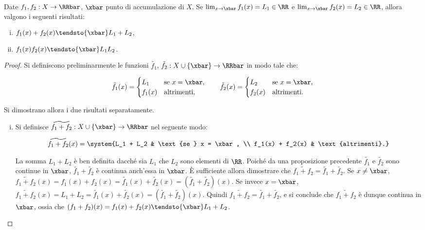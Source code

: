 \documentclass[11pt]{article}
\begin{document}
	\begin{proposition}
		Date $f_1, f_2 : X \to \RRbar$, $\xbar$ punto di accumulazione
		di $X$. Se $\lim_{x \to \xbar} f_1(x) = L_1 \in \RR$ e
		$\lim_{x \to \xbar} f_2(x) = L_2 \in \RR$, allora valgono
		i seguenti risultati:
		
		\begin{enumerate}[(i)]
			\item $f_1(x) + f_2(x) \tendsto{\xbar} L_1 + L_2$,
			\item $f_1(x) f_2(x) \tendsto{\xbar} L_1 L_2$.
		\end{enumerate}
	\end{proposition}

	\begin{proof}
		Si definiscono preliminarmente le funzioni $\tilde{f_1}$, $\tilde{f_2} : X \cup \{\xbar\} \to \RRbar$ in modo tale che:
		
		\[ \tilde{f_1}(x) = \begin{cases}
			L_1 & \text{se } x = \xbar, \\
			f_1(x) & \text{altrimenti},
		\end{cases} \qquad
		\tilde{f_2}(x) = \begin{cases}
			L_2 & \text{se } x = \xbar, \\
			f_2(x) & \text{altrimenti}.
		\end{cases} \]
		
		\vskip 0.05in
	
		Si dimostrano allora i due risultati separatamente. \\
		
		\begin{enumerate}[(i)]
			\item Si definisce $\widetilde{f_1 + f_2} : X \cup \{\xbar\} \to \RRbar$ nel seguente modo:
			
			\[ \widetilde{f_1 + f_2}(x) = \system{L_1 + L_2 & \text{se } x = \xbar, \\ f_1(x) + f_2(x) & \text{altrimenti}.} \]
			
			La somma $L_1 + L_2$ è ben definita dacché sia $L_1$ che $L_2$ sono elementi di $\RR$.
			Poiché da una proposizione precedente $\tilde{f_1}$ e $\tilde{f_2}$ sono continue in $\xbar$, $\tilde{f_1} + \tilde{f_2}$ è continua anch'essa in $\xbar$. È sufficiente allora dimostrare che $\widetilde{f_1 + f_2} =
			\tilde{f_1} + \tilde{f_2}$. Se $x \neq \xbar$, $\widetilde{f_1 + f_2}(x) = f_1(x) + f_2(x) = \tilde{f_1}(x) + \tilde{f_2}(x) = (\tilde{f_1} + \tilde{f_2})(x)$. Se invece $x = \xbar$, $\widetilde{f_1 + f_2}(x) = L_1 + L_2 =
			\tilde{f_1}(x) + \tilde{f_2}(x) = (\tilde{f_1} + \tilde{f_2})(x)$. Quindi $\widetilde{f_1 + f_2} =
			\tilde{f_1} + \tilde{f_2}$, e si conclude che $\widetilde{f_1 + f_2}$ è dunque continua in $\xbar$, ossia
			che $(f_1 + f_2)(x) = f_1(x) + f_2(x) \tendsto{\xbar} L_1 + L_2$.
			

\end{enumerate}
\end{proof}
\end{document}

